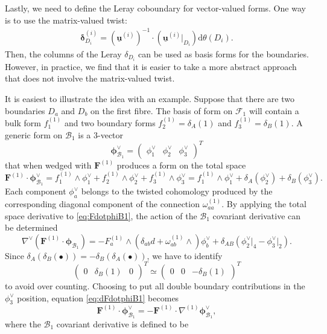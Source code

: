 \documentclass[11pt]{article}
\renewcommand{\d}{\text{d}}
\newcommand{\be}{\begin{equation}}
\newcommand{\ee}{\end{equation}}
\newcommand{\F}{\mathcal{F}}
\newcommand{\B}{\mathcal{B}}
\newcommand{\bs}[1]{\boldsymbol{#1}}
\newcommand{\mat}[1]{\underline{\boldsymbol{#1}}}
\begin{document}
Lastly, we need to define the Leray coboundary for vector-valued forms. 
One way is to use the matrix-valued twist:
\begin{align} \label{eq:matrix leray}
	\bs{\delta}_{D_i}^{(i)}
	= \left(\mat{u}^{(i)}\right)^{-1} \cdot \left(\mat{u}^{(i)}\vert_{D_i}\right) \d\theta(D_i).
\end{align}
Then, the columns of the Leray $\delta_{D_i}$ can be used as basis forms for the boundaries. 
However, in practice, we find that it is easier to take a more abstract approach that does not involve the matrix-valued twist. 

It is easiest to illustrate the idea with an example. Suppose that there are two boundaries $D_a$ and $D_b$ on the first fibre. The basis of form on $\F_1$ will contain a bulk form $f^{(1)}_1$ and two boundary forms $f^{(1)}_2 = \delta_{A}(1)$ and $f^{(1)}_3 = \delta_{B}(1)$. 
A generic form on $\B_1$ is a 3-vector 
\be
	\bs{\phi}_{\B_1}^\vee = \begin{pmatrix} \phi^\vee_1 & \phi^\vee_2 & \phi^\vee_3 \end{pmatrix}^T
\ee
that when wedged with $\bs{F}^{(1)}$ produces a form on the total space
\be \label{eq:FdotphiB1}
	\bs{F}^{(1)} \cdot \bs{\phi}^\vee_{\B_1} 
	= f^{(1)}_1 \wedge \phi^\vee_1 + f^{(1)}_2 \wedge \phi^\vee_2 + f^{(1)}_3 \wedge \phi^\vee_3
	= f^{(1)}_1 \wedge \phi^\vee_1 + \delta_A(\phi^\vee_2) + \delta_B(\phi^\vee_3). 
\ee
Each component $\phi^\vee_a$ belongs to the twisted cohomology produced by the corresponding diagonal component of the connection $\omega^{(1)}_{aa}$. By applying the total space derivative to \eqref{eq:FdotphiB1}, the action of the $\B_1$ covariant derivative can be determined
\be \label{eq:dFdotphiB1}
	\nabla^\vee ( \bs{F}^{(1)} \cdot \bs{\phi}_{\B_1} ) 
	= - F^{(1)}_a \wedge ( \delta_{ab} d + \omega^{(1)}_{ab} \wedge ) \phi^\vee_b + \delta_{AB}(\phi^\vee_2\vert_4 - \phi^\vee_3\vert_2).
\ee
Since $\delta_A(\delta_B(\bullet)) = -\delta_B(\delta_A(\bullet))$, we have to identify 
\be
	\begin{pmatrix}0&\delta_B(1)&0\end{pmatrix}^T
	\simeq \begin{pmatrix}0&0&-\delta_B(1)\end{pmatrix}^T
\ee
to avoid over counting. Choosing to put all double boundary contributions in the $\phi^\vee_3$ position, equation \eqref{eq:dFdotphiB1} becomes
\be
	\bs{F}^{(1)} \cdot \bs{\phi}^\vee_{\B_1} = - \bs{F}^{(1)} \cdot	\nabla^{(1)} \bs{\phi}^\vee_{\B_1},
\ee
where the $\B_1$ covariant derivative is defined to be
\end{document}
